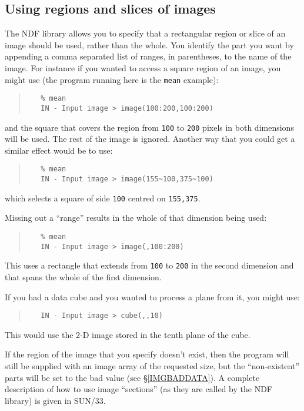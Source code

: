 \documentclass[twoside,11pt]{article}
\newcommand{\hyperref}[4]{#2\ref{#4}#3}
\newcommand{\htmlref}[2]{#1}
\newcommand{\xref}[3]{#1}
\renewcommand{\_}{\texttt{\symbol{95}}}
\newcommand{\myverb}[1]{{\texttt{#1}}}
\newenvironment{code}{\begin{small} \begin{quote}}
                     {\end{quote} \end{small}}
\begin{document}
\subsection{Using \label{IMGREGIONS}regions and slices of images}
The NDF library allows you to specify that a rectangular region or
slice of an image should be used, rather than the whole. You identify
the part you want by appending a comma separated list of ranges, in
parentheses, to the name of the image.  For instance if you wanted to
access a square region of an image, you might use (the program running
here is the \htmlref{\myverb{mean}}{IMGMEAN} example):
\begin{code}
\begin{verbatim}
   % mean
   IN - Input image > image(100:200,100:200)
\end{verbatim}
\end{code}
and the square that covers the region from \myverb{100} to
\myverb{200} pixels in both dimensions will be used. The rest of the image is
ignored. Another way that you could get a similar effect would be to
use:
\begin{code}
\begin{verbatim}
   % mean
   IN - Input image > image(155~100,375~100)
\end{verbatim}
\end{code}
which selects a square of side \myverb{100} centred on
\myverb{155,375}.

Missing out a ``range'' results in the whole of that dimension being
used:
\begin{code}
\begin{verbatim}
   % mean
   IN - Input image > image(,100:200)
\end{verbatim}
\end{code}
This uses a rectangle that extends from \myverb{100} to \myverb{200} in the
second dimension and that spans the whole of the first dimension.

If you had a data cube and you wanted to process a plane from it,
you might use:
\begin{code}
\begin{verbatim}
   IN - Input image > cube(,,10)
\end{verbatim}
\end{code}
This would use the 2-D image stored in the tenth plane of the cube.

If the region of the image that you specify doesn't exist, then the
program will still be supplied with an image array of the requested
size, but the ``non-existent'' parts will be set to the bad value (see
\hyperref{elsewhere}{\S}{}{IMGBADDATA}).  A complete description of
how to use image ``sections'' (as they are called by the NDF library)
is given in \xref{SUN/33}{sun33}{}.
\end{document}

